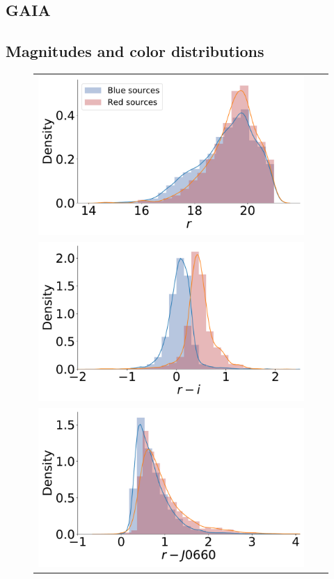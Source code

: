 \documentclass[fleqn,usenatbib]{mnras}
\begin{document}
\subsection{GAIA}

\subsection{Magnitudes and color distributions}

\begin{figure}
  \begin{tabular}{l l l}
  \includegraphics[width=\columnwidth]{Figs/distribution_r-group.pdf} \\
    \includegraphics[width=\columnwidth]{Figs/distribution-ri-group.pdf}\\
    \includegraphics[width=\columnwidth]{Figs/distribution-Halpha-group.pdf}

\end{tabular}
\end{figure}
\end{document}
